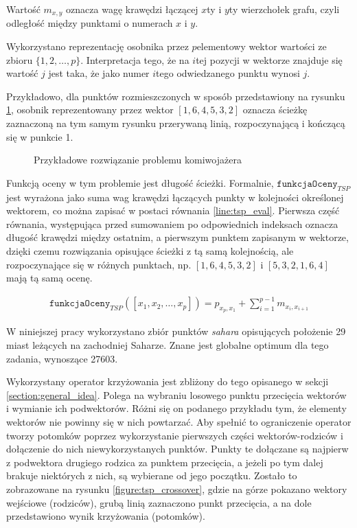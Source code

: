 \documentclass[twoside]{iisthesis}
\newcommand{\param}[1]{\mathtt{#1}}
\begin{document}
Wartość $m_{x, y}$ oznacza wagę krawędzi łączącej $x$ty i $y$ty wierzchołek grafu, czyli odległość między punktami o numerach $x$ i $y$.

Wykorzystano reprezentację osobnika przez $p$elementowy wektor wartości ze zbioru $\{ 1, 2, \ldots, p \}$.
Interpretacja tego, że na $i$tej pozycji w wektorze znajduje się wartość $j$ jest taka, że jako numer $i$tego odwiedzanego punktu wynosi $j$.

Przykładowo, dla punktów rozmieszczonych w sposób przedstawiony na rysunku \ref{figure:tsp_example}, osobnik reprezentowany przez wektor $[1, 6, 4, 5, 3, 2]$ oznacza ścieżkę zaznaczoną na tym samym rysunku przerywaną linią, rozpoczynającą i kończącą się w punkcie 1.

\begin{figure} [H]
	\caption{Przykładowe rozwiązanie problemu komiwojażera \label{figure:tsp_example}}
	\centering
\end{figure}

Funkcją oceny w tym problemie jest długość ścieżki. 
Formalnie, $\param{funkcjaOceny}_{TSP}$ jest wyrażona jako suma wag krawędzi łączących punkty w kolejności określonej wektorem, co można zapisać w postaci równania \ref{line:tsp_eval}. 
Pierwsza część równania, występująca przed sumowaniem po odpowiednich indeksach oznacza długość krawędzi między ostatnim, a pierwszym punktem zapisanym w wektorze, dzięki czemu rozwiązania opisujące ścieżki z tą samą kolejnością, ale rozpoczynające się w różnych punktach, np. $[1, 6, 4, 5, 3, 2]$ i $[5, 3, 2, 1, 6, 4]$ mają tą samą ocenę.

\begin{align}
	\param{funkcjaOceny}_{TSP}([x_1, x_2, \ldots, x_p]) = p_{x_p, x_1} + \sum_{i=1}^{p-1} m_{x_i, x_{i+1}} \label{line:tsp_eval}
\end{align}

W niniejszej pracy wykorzystano zbiór punktów \emph{sahara} \cite{sahara_points} opisujących położenie 29 miast leżących na zachodniej Saharze. 
Znane jest globalne optimum dla tego zadania, wynoszące 27603.

Wykorzystany operator krzyżowania jest zbliżony do tego opisanego w sekcji \ref{section:general_idea}. 
Polega na wybraniu losowego punktu przecięcia wektorów i wymianie ich podwektorów. 
Różni się on podanego przykładu tym, że elementy wektorów nie powinny się w nich powtarzać.
Aby spełnić to ograniczenie operator tworzy potomków poprzez wykorzystanie pierwszych części wektorów-rodziców i dołączenie do nich niewykorzystanych punktów.
Punkty te dołączane są najpierw z podwektora drugiego rodzica za punktem przecięcia, a jeżeli po tym dalej brakuje niektórych z nich, są wybierane od jego początku.
Zostało to zobrazowane na rysunku \ref{figure:tsp_crossover}, gdzie na górze pokazano wektory wejściowe (rodziców), grubą linią zaznaczono punkt przecięcia, a na dole przedstawiono wynik krzyżowania (potomków).
\end{document}
